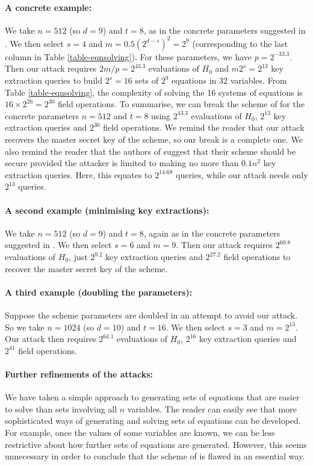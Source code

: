 \documentclass{llncs}
\begin{document}
\paragraph{A concrete example:} We take $n=512$ (so $d=9$) and $t=8$, as in the concrete parameters suggested in \cite{CCGHC10}. We then select $s=4$ and $m=0.5 (2^{d-s})^2=2^{9}$ (corresponding to the last column in Table \ref{table-eqnsolving}). For these parameters, we have $p=2^{-33.3}$. Then our attack requires $2m/p=2^{43.3}$ evaluations of $H_0$ and $m2^s=2^{13}$ key extraction queries to build $2^s=16$ sets of $2^{9}$ equations in 32 variables. From Table \ref{table-eqnsolving}, the complexity of solving the 16 systems of equations is $16 \times 2^{26} = 2^{30}$ field operations. To summarise, we can break the scheme of \cite{CCGHC10} for the concrete parameters $n=512$ and $t=8$ using $2^{43.3}$ evaluations of $H_0$, $2^{13}$ key extraction queries and $2^{30}$ field operations. We remind the reader that our attack recovers the master secret key of the scheme, so our break is a complete one. We also remind the reader that the authors of \cite{CCGHC10} suggest that their scheme should be secure provided the attacker is limited to making no more than $0.1 n^2$ key extraction queries. Here, this equates to $2^{14.68}$ queries, while our attack needs only $2^{13}$ queries.

\paragraph{A second example (minimising key extractions):} We take $n=512$ (so $d=9$) and $t=8$, again as in the concrete parameters suggested in \cite{CCGHC10}. We then select $s=6$ and $m=9$. Then our attack requires $2^{60.8}$ evaluations of $H_0$, just $2^{9.2}$ key extraction queries and $2^{27.2}$ field operations to recover the master secret key of the scheme.

\paragraph{A third example (doubling the parameters):} Suppose the scheme parameters are doubled in an attempt to avoid our attack. So we take $n=1024$ (so $d=10$) and $t=16$. We then select $s=3$ and $m=2^{13}$. Our attack then requires $2^{64.1}$ evaluations of $H_0$, $2^{16}$ key extraction queries and $2^{41}$ field operations.

\paragraph{Further refinements of the attacks:}
We have taken a simple approach to generating sets of equations that are easier to solve than sets involving all $n$ variables. The reader can easily see that more sophisticated ways of generating and solving sets of equations can be developed. For example, once the values of some variables are known, we can be less restrictive about how further sets of equations are generated. However, this seems unnecessary in order to conclude that the scheme of \cite{CCGHC10} is flawed in an essential way.
\end{document}

